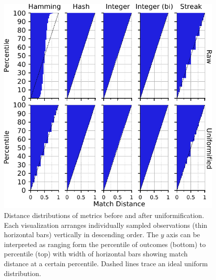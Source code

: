 \begin{figure}
\begin{center}

\includegraphics[width=\columnwidth]{img/uniformification/bitweight=0dot5+seed=1+title=low-score-distribution+_data_hathash_hash=75684cf1e73fb7f1+_script_fullcat_hash=c3113c80efb02374+ext=}
\caption{
Distance distributions of metrics before and after uniformification.
Each visualization arranges individually sampled observations (thin horizontal bars) vertically in descending order.
The $y$ axis can be interpreted as ranging form the  percentile of outcomes (bottom) to  percentile (top) with width of horizontal bars showing match distance at a certain percentile.
Dashed lines trace an ideal uniform distribution.
}
\label{fig:uniformification_supp}

\end{center}
\end{figure}
